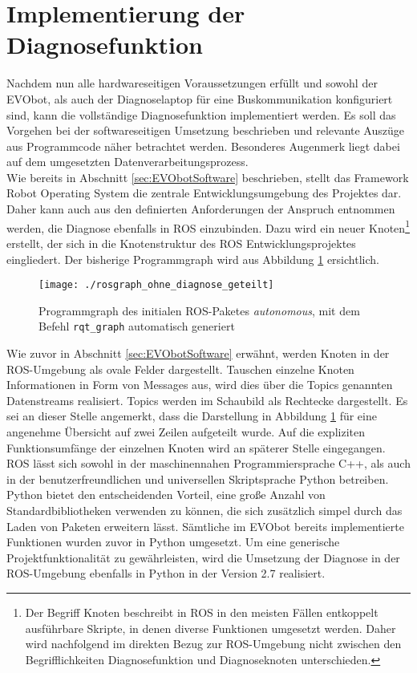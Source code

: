 \section{Implementierung der Diagnosefunktion} \label{sec:ImplementierungDiagnose} %

Nachdem nun alle hardwareseitigen Voraussetzungen erfüllt und sowohl der EVObot, als auch der Diagnoselaptop für eine Buskommunikation konfiguriert sind, kann die vollständige Diagnosefunktion implementiert werden. Es soll das Vorgehen bei der softwareseitigen Umsetzung beschrieben und relevante Auszüge aus Programmcode näher betrachtet werden. Besonderes Augenmerk liegt dabei auf dem umgesetzten Datenverarbeitungsprozess.\\
Wie bereits in Abschnitt \ref{sec:EVObotSoftware} beschrieben, stellt das Framework Robot Operating System die zentrale Entwicklungsumgebung des Projektes dar. Daher kann auch aus den definierten Anforderungen der Anspruch entnommen werden, die Diagnose ebenfalls in ROS einzubinden. Dazu wird ein neuer Knoten\footnote{Der Begriff Knoten beschreibt in ROS in den meisten Fällen entkoppelt ausführbare Skripte, in denen diverse Funktionen umgesetzt werden. Daher wird nachfolgend im direkten Bezug zur ROS-Umgebung nicht zwischen den Begrifflichkeiten Diagnosefunktion und Diagnoseknoten unterschieden.} erstellt, der sich in die Knotenstruktur des ROS Entwicklungsprojektes eingliedert. Der bisherige Programmgraph wird aus Abbildung \ref{abb:rosgraphOhneDiagnose} ersichtlich.

\begin{figure}[!htbp]
	\centering
	\texttt{[image: ./rosgraph\_ohne\_diagnose\_geteilt]}
	\caption{Programmgraph des initialen ROS-Paketes \emph{autonomous}, mit dem Befehl \texttt{rqt\_graph} automatisch generiert}
	\label{abb:rosgraphOhneDiagnose}
\end{figure} 

Wie zuvor in Abschnitt \ref{sec:EVObotSoftware} erwähnt, werden Knoten in der ROS-Umgebung als ovale Felder dargestellt. Tauschen einzelne Knoten Informationen in Form von Messages aus, wird dies über die Topics genannten Datenstreams realisiert. Topics werden im Schaubild als Rechtecke dargestellt. Es sei an dieser Stelle angemerkt, dass die Darstellung in Abbildung \ref{abb:rosgraphOhneDiagnose} für eine angenehme Übersicht auf zwei Zeilen aufgeteilt wurde. Auf die expliziten Funktionsumfänge der einzelnen Knoten wird an späterer Stelle eingegangen.\\
ROS lässt sich sowohl in der maschinennahen Programmiersprache C++, als auch in der benutzerfreundlichen und universellen Skriptsprache Python betreiben. Python bietet den entscheidenden Vorteil, eine große Anzahl von Standardbibliotheken verwenden zu können, die sich zusätzlich simpel durch das Laden von Paketen erweitern lässt. Sämtliche im EVObot bereits implementierte Funktionen wurden zuvor in Python umgesetzt. Um eine generische Projektfunktionalität zu gewährleisten, wird die Umsetzung der Diagnose in der ROS-Umgebung ebenfalls in Python in der Version 2.7 realisiert.



